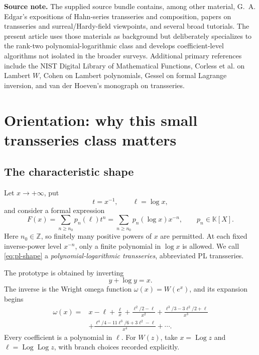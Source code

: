 \documentclass[11pt,oneside]{article}
\numberwithin{equation}{section}
\theoremstyle{definition}
\newcommand{\K}{\mathbb K}
\newcommand{\Z}{\mathbb Z}
\newcommand{\Log}{\operatorname{Log}}
\begin{document}
\begin{center}
\begin{minipage}{0.92\textwidth}
\small
\textbf{Source note.}  The supplied source bundle contains, among other material,
G.~A. Edgar's expositions of Hahn-series transseries and composition, papers on
transseries and surreal/Hardy-field viewpoints, and several broad tutorials.  The
present article uses those materials as background but deliberately specializes
to the rank-two polynomial-logarithmic class and develops coefficient-level
algorithms not isolated in the broader surveys.  Additional primary references
include the NIST Digital Library of Mathematical Functions, Corless et al. on
Lambert \(W\), Cohen on Lambert polynomials, Gessel on formal Lagrange inversion,
and van der Hoeven's monograph on transseries.
\end{minipage}
\end{center}

\clearpage
\tableofcontents
\clearpage
{}

\section{Orientation: why this small transseries class matters}

\subsection{The characteristic shape}

Let \(x\to+\infty\), put
\[
  t=x^{-1},\qquad \ell=\log x,
\]
and consider a formal expression
\begin{equation}\label{eq:pl-shape}
  F(x)=\sum_{n\ge n_0}p_n(\ell)t^n
      =\sum_{n\ge n_0}p_n(\log x)x^{-n},
  \qquad p_n\in\K[X].
\end{equation}
Here \(n_0\in\Z\), so finitely many positive powers of \(x\) are permitted.
At each fixed inverse-power level \(x^{-n}\), only a finite polynomial in
\(\log x\) is allowed.  We call \eqref{eq:pl-shape} a
\emph{polynomial-logarithmic transseries}, abbreviated PL transseries.

The prototype is obtained by inverting
\[
  y+\log y=x.
\]
The inverse is the Wright omega function \(\omega(x)=W(e^x)\), and its expansion
begins
\begin{equation}\label{eq:omega-preview}
\begin{split}
  \omega(x)={}&x-\ell+\frac{\ell}{x}
  +\frac{\ell^2/2-\ell}{x^2}
  +\frac{\ell^3/3-3\ell^2/2+\ell}{x^3}\\
  &+\frac{\ell^4/4-11\ell^3/6+3\ell^2-\ell}{x^4}+\cdots.
\end{split}
\end{equation}
Every coefficient is a polynomial in \(\ell\).  For \(W(z)\), take
\(x=\Log z\) and \(\ell=\Log\Log z\), with branch choices recorded explicitly.
\end{document}
